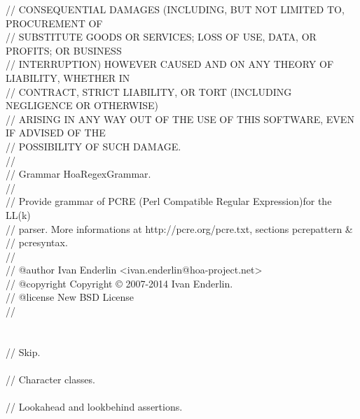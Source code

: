\begin{bigbigpre}
// CONSEQUENTIAL DAMAGES (INCLUDING, BUT NOT LIMITED TO, PROCUREMENT OF \\
// SUBSTITUTE GOODS OR SERVICES; LOSS OF USE, DATA, OR PROFITS; OR BUSINESS \\
// INTERRUPTION) HOWEVER CAUSED AND ON ANY THEORY OF LIABILITY, WHETHER IN \\
// CONTRACT, STRICT LIABILITY, OR TORT (INCLUDING NEGLIGENCE OR OTHERWISE) \\
// ARISING IN ANY WAY OUT OF THE USE OF THIS SOFTWARE, EVEN IF ADVISED OF THE \\
// POSSIBILITY OF SUCH DAMAGE. \\
// \\
// Grammar \bslash{}Hoa\bslash{}Regex\bslash{}Grammar. \\
// \\
// Provide grammar of PCRE (Perl Compatible Regular Expression)for the LL(k) \\
// parser. More informations at http://pcre.org/pcre.txt, sections pcrepattern & \\
// pcresyntax. \\
// \\
// @author     Ivan Enderlin <ivan.enderlin@hoa-project.net> \\
// @copyright  Copyright © 2007-2014 Ivan Enderlin. \\
// @license    New BSD License \\
// \\
 \\
 \\
// Skip. \\
 \\
// Character classes. \\
 \\
// Lookahead and lookbehind assertions. \\

\end{bigbigpre}
